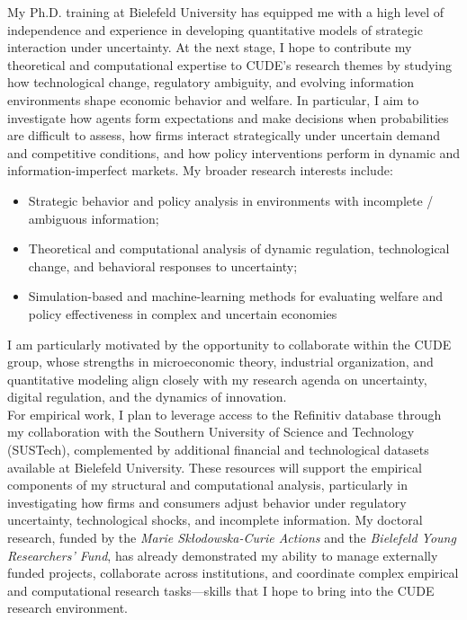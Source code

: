 \documentclass{nfr}
\begin{document}
My Ph.D. training at Bielefeld University has equipped me with a high level of independence and experience in developing quantitative models of strategic interaction under uncertainty. 
At the next stage, I hope to contribute my theoretical and computational expertise to CUDE’s research themes by studying how technological change, regulatory ambiguity, and evolving information environments shape economic behavior and welfare. 
In particular, I aim to investigate how agents form expectations and make decisions when probabilities are difficult to assess, how firms interact strategically under uncertain demand and competitive conditions, and how policy interventions perform in dynamic and information-imperfect markets.
My broader research interests include:
\begin{itemize}
    \item Strategic behavior and policy analysis in environments with incomplete / ambiguous information;
    \item Theoretical and computational analysis of dynamic regulation, technological change, and behavioral responses to uncertainty;
    \item Simulation-based and machine-learning methods for evaluating welfare and policy effectiveness in complex and uncertain economies
\end{itemize}

I am particularly motivated by the opportunity to collaborate within the CUDE group, whose strengths in microeconomic theory, industrial organization, and quantitative modeling align closely with my research agenda on uncertainty, digital regulation, and the dynamics of innovation.\\

For empirical work, I plan to leverage access to the Refinitiv database through my collaboration with the Southern University of Science and Technology (SUSTech), complemented by additional financial and technological datasets available at Bielefeld University. 
These resources will support the empirical components of my structural and computational analysis, particularly in investigating how firms and consumers adjust behavior under regulatory uncertainty, technological shocks, and incomplete information. 
My doctoral research, funded by the \textit{Marie Skłodowska-Curie Actions} and the \textit{Bielefeld Young Researchers’ Fund}, has already demonstrated my ability to manage externally funded projects, collaborate across institutions, and coordinate complex empirical and computational research tasks—skills that I hope to bring into the CUDE research environment.\\
\end{document}
